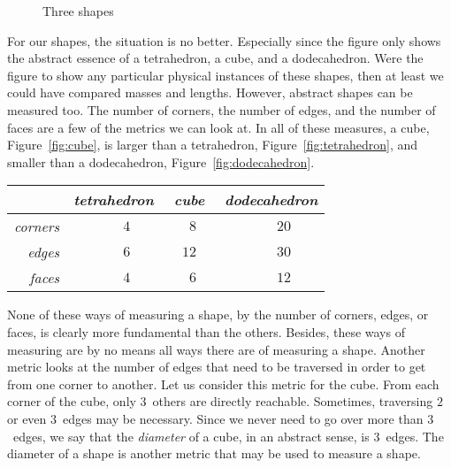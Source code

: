 \begin{figure}[bp]
{
  }
  \caption{
    Three shapes
  }
  \label{fig:shapes}
\end{figure}

For our shapes, the situation is no better.
Especially since the figure only shows the abstract essence of a tetrahedron, a cube, and a dodecahedron.
Were the figure to show any particular physical instances of these shapes, then at least we could have compared masses and lengths.
However, abstract shapes can be measured too.
The number of corners, the number of edges, and the number of faces are a few of the metrics we can look at.
In all of these measures, a cube, Figure~\ref{fig:cube}, is larger than a tetrahedron, Figure~\ref{fig:tetrahedron}, and smaller than a dodecahedron, Figure~\ref{fig:dodecahedron}.
\begin{center}
  \begin{tabular}{r|p{2em}rp{1em}p{2em}rp{1em}p{2em}rp{1em}}
    &	\multicolumn{3}{c}{\emph{tetrahedron}}	& \multicolumn{3}{c}{\emph{cube}}	& \multicolumn{3}{c}{\emph{dodecahedron}} \\
    \hline
    \emph{corners}	&& $4$	&&& $8$	&&& $20$ \\
    \emph{edges}	&& $\phantom{0}6$	&&& $12$	&&& $30$	& \hspace{0pt} \\
    \emph{faces}	&& $4$	&&& $6$	&&& $12$
  \end{tabular}
\end{center}

None of these ways of measuring a shape, by the number of corners, edges, or faces, is clearly more fundamental than the others.
Besides, these ways of measuring are by no means all ways there are of measuring a shape.
Another metric looks at the number of edges that need to be traversed in order to get from one corner to another.
Let us consider this metric for the cube.
From each corner of the cube, only $3$~others are directly reachable.
Sometimes, traversing $2$ or even $3$~edges may be necessary.
Since we never need to go over more than $3$~edges, we say that the \emph{diameter} of a cube, in an abstract sense, is $3$~edges.
The diameter of a shape is another metric that may be used to measure a shape.

